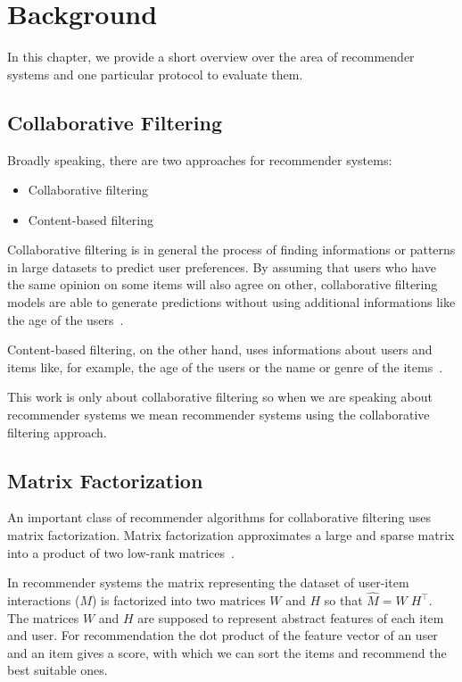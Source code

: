 
\chapter{Background}
\label{background}
In this chapter, we provide a short overview over the 
area of recommender systems and one particular protocol to evaluate them.


\section{Collaborative Filtering}
Broadly speaking, there are two approaches for recommender systems:
\begin{itemize}
\item Collaborative filtering
\item Content-based filtering
\end{itemize}

Collaborative filtering is in general the process of finding 
informations or patterns in large datasets to predict user preferences. By assuming that users who 
have the same opinion on some items will also agree on other, collaborative filtering models are able to generate predictions without using additional informations like the age of 
the users~\cite{collaborativefiltering}.

Content-based filtering, on the other hand, uses informations about users and items
like, for example, the age of the users or the name or genre of the items~\cite{contentbasedfiltering}.

This work is only about collaborative filtering so when we are 
speaking about recommender systems we mean recommender systems
using the collaborative filtering approach.


\section{Matrix Factorization}
\label{matrixfactorization}
An important class of recommender algorithms for collaborative filtering uses matrix factorization. 
Matrix factorization approximates a large and sparse matrix into a product of two low-rank matrices~\cite{matrixfactorization}.

In recommender systems the matrix representing the dataset of user-item interactions ($M$) is factorized into
two matrices \(W\) and \(H\) so that \(\hat{M} = W\;H^\top\).
The matrices \(W\) and \(H\) are supposed to represent abstract
features of each item and user. For recommendation the dot product
of the feature vector of an user and an item gives a score, with which
we can sort the items and recommend the best suitable ones. 


